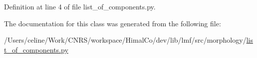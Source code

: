 Definition at line 4 of file list\+\_\+of\+\_\+components.\+py.



The documentation for this class was generated from the following file\+:\begin{DoxyCompactItemize}
\item 
/\+Users/celine/\+Work/\+C\+N\+R\+S/workspace/\+Himal\+Co/dev/lib/lmf/src/morphology/\hyperlink{list__of__components_8py}{list\+\_\+of\+\_\+components.\+py}\end{DoxyCompactItemize}
